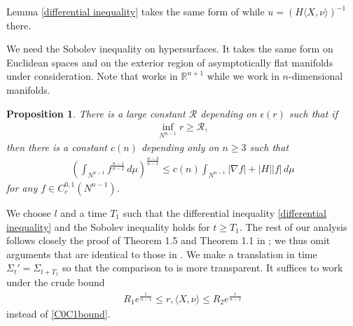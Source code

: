 \documentclass[12pt,twoside]{article}
\theoremstyle{plain}
\newtheorem{prop}[theorem]{Proposition}
\theoremstyle{definition}
\theoremstyle{remark}
\newcommand{\na}{\nabla}
\newcommand{\lt}{\left}
\newcommand{\rt}{\right}
\newcommand{\R}{\mathbb{R}}
\numberwithin{equation}{section}
\begin{document}
Lemma \ref{differential inequality} takes the same form of \cite[Lemma 1.4]{HI2} while $u = (H \langle X,\nu \rangle)^{-1}$ there. 

We need the Sobolev inequality on hypersurfaces.  It takes the same form on Euclidean spaces and on the exterior region of asymptotically flat manifolds under consideration. Note that \cite{HI2} works in $\R^{n+1}$ while we work in $n$-dimensional manifolds.

\begin{prop}\cite[Theorem 2.1]{HoSp}
There is a large constant $\mathcal{R}$ depending on $\epsilon(r)$ such that if
\begin{align*}
\inf_{N^{n-1}} r \ge \mathcal{R}, 
\end{align*}
then there is a constant $c(n)$ depending only on $n \ge 3$ such that
\begin{align*}
\lt( \int_{N^{n-1}} f^{\frac{n-1}{n-2}} \,d\mu\rt)^{\frac{n-2}{n-1}} \le c(n) \int_{N^{n-1}} |\na f| + |H||f| \,d\mu
\end{align*}
for any $f \in C^{0,1}_c(N^{n-1})$.
\end{prop}

We choose $l$ and a time $T_1$ such that the differential inequality \eqref{differential inequality} and the Sobolev inequality holds for $t \ge T_1$. The rest of our analysis follows closely the proof of Theorem 1.5 and Theorem 1.1 in \cite{HI2}; we thus omit arguments that are identical to those in \cite{HI2}. We make a translation in time $\Sigma_t' = \Sigma_{t + T_1}$ so that the comparison to \cite{HI2} is more transparent. It suffices to work under the crude bound
\begin{align}
R_1 e^{\frac{t}{n-1}} \le r, \langle X,\nu\rangle \le R_2 e^{\frac{t}{n-1}}
\end{align}
instead of \eqref{C0C1bound}.
 
\end{document}
